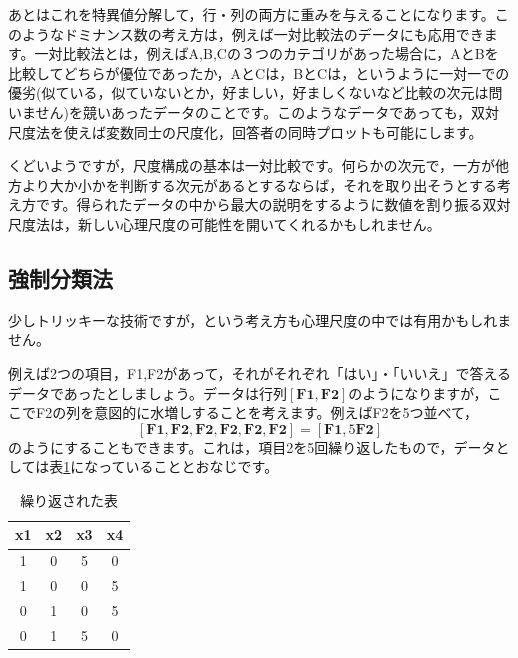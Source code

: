 \documentclass{ltjsbook}
\begin{document}
あとはこれを特異値分解して，行・列の両方に重みを与えることになります。このようなドミナンス数の考え方は，例えば一対比較法のデータにも応用できます。一対比較法とは，例えばA,B,Cの３つのカテゴリがあった場合に，AとBを比較してどちらが優位であったか，AとCは，BとCは，というように一対一での優劣(似ている，似ていないとか，好ましい，好ましくないなど比較の次元は問いません)を競いあったデータのことです。このようなデータであっても，双対尺度法を使えば変数同士の尺度化，回答者の同時プロットも可能にします。

くどいようですが，尺度構成の基本は一対比較です。何らかの次元で，一方が他方より大か小かを判断する次元があるとするならば，それを取り出そうとする考え方です。得られたデータの中から最大の説明をするように数値を割り振る双対尺度法は，新しい心理尺度の可能性を開いてくれるかもしれません。

\subsection{強制分類法}

少しトリッキーな技術ですが，という考え方も心理尺度の中では有用かもしれません。

例えば2つの項目，F1,F2があって，それがそれぞれ「はい」・「いいえ」で答えるデータであったとしましょう。データは行列$[\bm{F1},\bm{F2}]$のようになりますが，ここでF2の列を意図的に水増しすることを考えます。例えばF2を5つ並べて，
\[    [\bm{F1},\bm{F2},\bm{F2},\bm{F2},\bm{F2},\bm{F2}] = [\bm{F1},5\bm{F2}] \]
のようにすることもできます。これは，項目2を5回繰り返したもので，データとしては表\ref{FCexam}になっていることとおなじです。
\begin{table}[ht]
	\begin{center}
		\caption{繰り返された表}
		\begin{tabular}{cc|cc}
			x1 & x2 & x3 & x4 \\
			\hline
			1  & 0  & 5  & 0  \\
			1  & 0  & 0  & 5  \\
			0  & 1  & 0  & 5  \\
			0  & 1  & 5  & 0  \\
		\end{tabular}
		\label{FCexam}
	\end{center}
\end{table}
\end{document}

